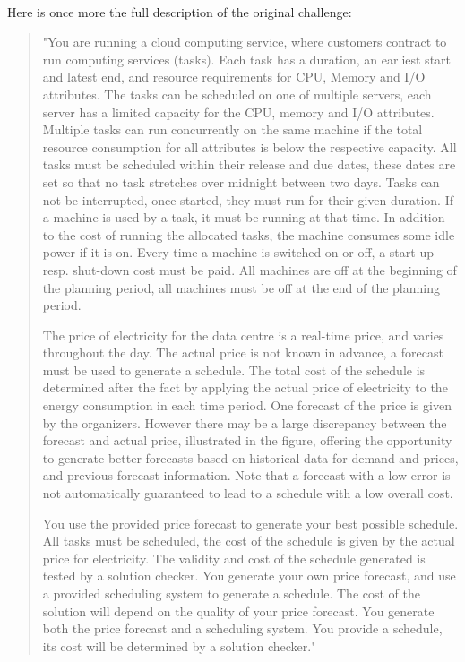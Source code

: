 \documentclass[a4,10pt]{article}
\begin{document}
\paragraph{}
Here is once more the full description of the original challenge:
\begin{quotation}
"You are running a cloud computing service, where customers contract to run computing services (tasks). Each task has a duration, an earliest start and latest end, and resource requirements for CPU, Memory and I/O attributes. The tasks can be scheduled on one of multiple servers, each server has a limited capacity for the CPU, memory and I/O attributes. Multiple tasks can run concurrently on the same machine if the total resource consumption for all attributes is below the respective capacity. All tasks must be scheduled within their release and due dates, these dates are set so that no task stretches over midnight between two days. Tasks can not be interrupted, once started, they must run for their given duration. If a machine is used by a task, it must be running at that time. In addition to the cost of running the allocated tasks, the machine consumes some idle power if it is on. Every time a machine is switched on or off, a start-up resp. shut-down cost must be paid. All machines are off at the beginning of the planning period, all machines must be off at the end of the planning period.

The price of electricity for the data centre is a real-time price, and varies throughout the day. The actual price is not known in advance, a forecast must be used to generate a schedule. The total cost of the schedule is determined after the fact by applying the actual price of electricity to the energy consumption in each time period. One forecast of the price is given by the organizers. However there may be a large discrepancy between the forecast and actual price, illustrated in the figure, offering the opportunity to generate better forecasts based on historical data for demand and prices, and previous forecast information. Note that a forecast with a low error is not automatically guaranteed to lead to a schedule with a low overall cost.

You use the provided price forecast to generate your best possible schedule. All tasks must be scheduled, the cost of the schedule is given by the actual price for electricity. The validity and cost of the schedule generated is tested by a solution checker. You generate your own price forecast, and use a provided scheduling system to generate a schedule. The cost of the solution will depend on the quality of your price forecast. You generate both the price forecast and a scheduling system. You provide a schedule, its cost will be determined by a solution checker."
\end{quotation}
\end{document}
